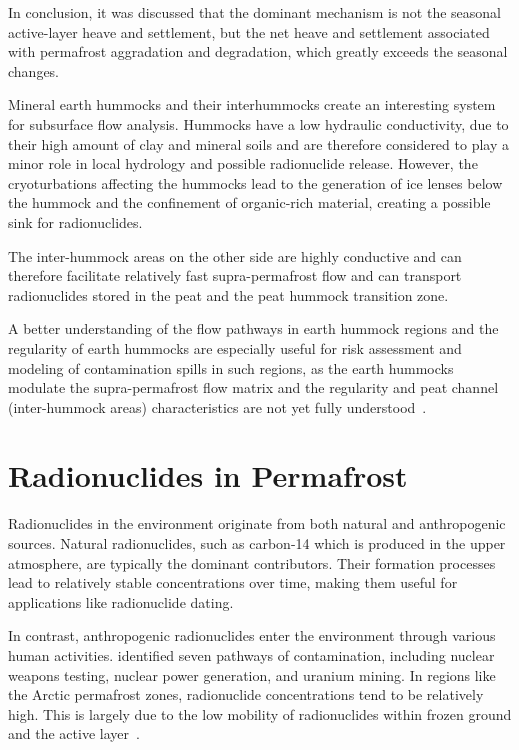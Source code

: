 In conclusion, it was discussed that the dominant mechanism is not the seasonal active-layer heave and settlement, but the net heave and settlement associated with permafrost aggradation and degradation, which greatly exceeds the seasonal changes.

Mineral earth hummocks and their interhummocks create an interesting system for subsurface flow analysis. 
Hummocks have a low hydraulic conductivity, due to their high amount of clay and mineral soils and are therefore considered to play a minor role in local hydrology and possible radionuclide release. 
However, the cryoturbations affecting the hummocks lead to the generation of ice lenses below the hummock and the confinement of organic-rich material, creating a possible sink for radionuclides.

The inter-hummock areas on the other side are highly conductive and can therefore facilitate relatively fast supra-permafrost flow and can transport radionuclides stored in the peat and the peat hummock transition zone. 

A better understanding of the flow pathways in earth hummock regions and the regularity of earth hummocks are especially useful for risk assessment and modeling of contamination spills in such regions, as the earth hummocks modulate the supra-permafrost flow matrix and the regularity and peat channel (inter-hummock areas) characteristics are not yet fully understood~\citep{dakinHowDryYear2023,quintonSubsurfaceDrainageHummockcovered2000}.

\section{Radionuclides in Permafrost}
Radionuclides in the environment originate from both natural and anthropogenic sources. 
Natural radionuclides, such as carbon-14 which is produced in the upper atmosphere, are typically the dominant contributors. 
Their formation processes lead to relatively stable concentrations over time, making them useful for applications like radionuclide dating.

In contrast, anthropogenic radionuclides enter the environment through various human activities. 
\citet{huSourcesAnthropogenicRadionuclides2010} identified seven pathways of contamination, including nuclear weapons testing, nuclear power generation, and uranium mining. 
In regions like the Arctic permafrost zones, radionuclide concentrations tend to be relatively high. 
This is largely due to the low mobility of radionuclides within frozen ground and the active layer~\citep{bondPermafrostThawImplications2018}.

